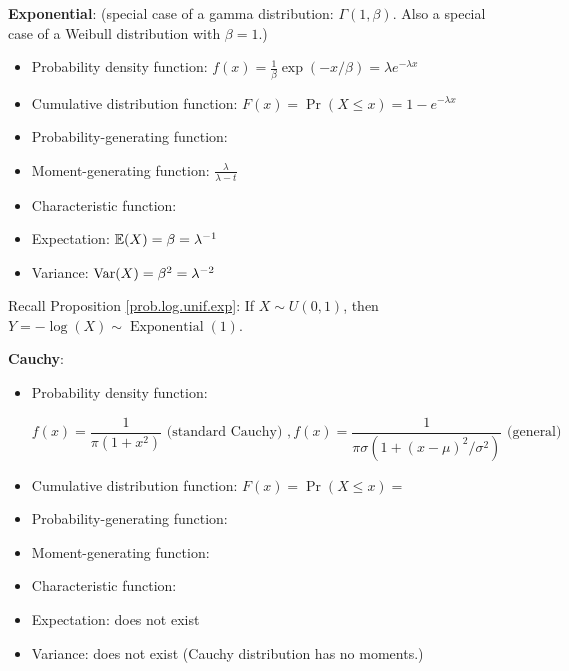 
\textbf{Exponential}: \label{prob.exp} (special case of a gamma distribution: \(\Gamma(1, \beta)\). Also a special case of a Weibull distribution with \(\beta = 1\).)

\begin{itemize}

\item Probability density function: \(f(x) = \frac{1}{\beta} \exp(-x/\beta) = \lambda e^{- \lambda x} \)

\item Cumulative distribution function: \(F(x) = \Pr(X \leq x) = 1 - e^{-\lambda x}\)

\item Probability-generating function:

\item Moment-generating function: \(\frac{\lambda}{\lambda - t}\)

\item Characteristic function:

\item Expectation: \(\E(X) = \beta = \lambda^{-1} \)

\item Variance: \(\Var(X) = \beta^2 = \lambda^{-2}  \)

\end{itemize}

\begin{remark}
Recall Proposition \ref{prob.log.unif.exp}: If \(X \sim U(0, 1)\), then \(Y = - \log(X) \sim \operatorname{Exponential}(1)\). 
\end{remark}

\textbf{Cauchy}: 

\begin{itemize}

\item Probability density function: 

\[
f(x) = \frac{1}{\pi(1 + x^2)} \text{ (standard Cauchy) }, f(x) = \frac{1}{\pi \sigma (1 + (x - \mu)^2/\sigma^2)}  \text{ (general)}
\]

\item Cumulative distribution function: \(F(x) = \Pr(X \leq x) = \)

\item Probability-generating function:

\item Moment-generating function:

\item Characteristic function:

\item Expectation: does not exist

\item Variance: does not exist (Cauchy distribution has no moments.)

\end{itemize}

